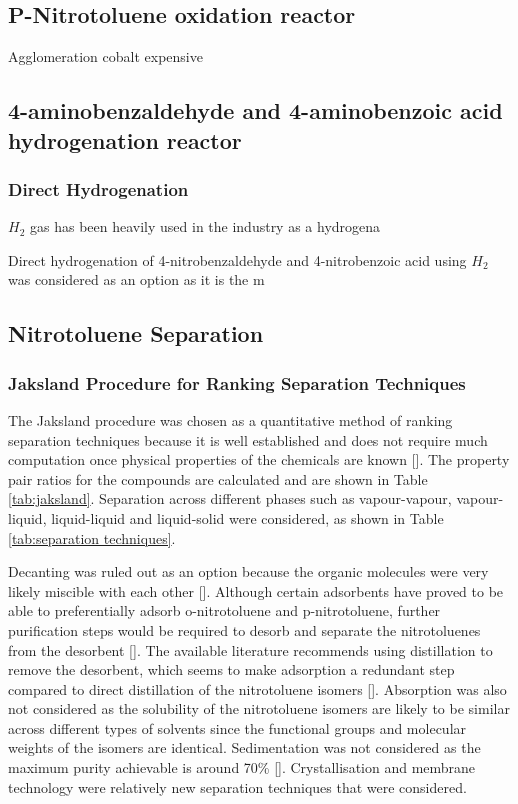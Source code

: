 \subsection{P-Nitrotoluene oxidation reactor}
Agglomeration
cobalt expensive

\subsection{4-aminobenzaldehyde and 4-aminobenzoic acid hydrogenation reactor}
\subsubsection{Direct Hydrogenation}
$H_2$ gas has been heavily used in the industry as a hydrogena

Direct hydrogenation of 4-nitrobenzaldehyde and 4-nitrobenzoic acid using $H_2$ was considered as an option as it is the m

\subsection{Nitrotoluene Separation}
\subsubsection{Jaksland Procedure for Ranking Separation Techniques}
The Jaksland procedure was chosen as a quantitative method of ranking separation techniques because it is well established and does not require much computation once physical properties of the chemicals are known []. The property pair ratios for the compounds are calculated and are shown in Table \ref{tab:jaksland}. Separation across different phases such as vapour-vapour, vapour-liquid, liquid-liquid and liquid-solid were considered, as shown in Table \ref{tab:separation techniques}.

Decanting was ruled out as an option because the organic molecules were very likely miscible with each other []. Although certain adsorbents have proved to be able to preferentially adsorb o-nitrotoluene and p-nitrotoluene, further purification steps would be required to desorb and separate the nitrotoluenes from the desorbent []. The available literature recommends using distillation to remove the desorbent, which seems to make adsorption a redundant step compared to direct distillation of the nitrotoluene isomers []. Absorption was also not considered as the solubility of the nitrotoluene isomers are likely to be similar across different types of solvents since the functional groups and molecular weights of the isomers are identical. Sedimentation was not considered as the maximum purity achievable is around 70\% []. Crystallisation and membrane technology were relatively new separation techniques that were considered. 

